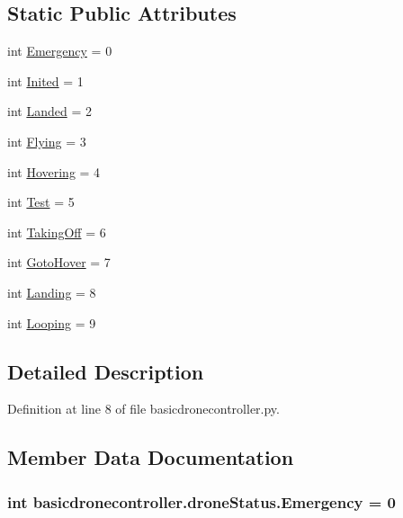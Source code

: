 \subsection*{Static Public Attributes}
\begin{DoxyCompactItemize}
\item 
int \hyperlink{classbasicdronecontroller_1_1droneStatus_aac1e2fb427e0e18858ce2066819ad0b2}{Emergency} = 0
\item 
int \hyperlink{classbasicdronecontroller_1_1droneStatus_a863d58782e3420a6d75708af2918cd62}{Inited} = 1
\item 
int \hyperlink{classbasicdronecontroller_1_1droneStatus_a000dd254bab4b0e9b269b3890e3332c3}{Landed} = 2
\item 
int \hyperlink{classbasicdronecontroller_1_1droneStatus_a5d0bf13223a3b7a124ffaffbdb3dc64b}{Flying} = 3
\item 
int \hyperlink{classbasicdronecontroller_1_1droneStatus_ae3e6d81aa58b0c268e4084606686317d}{Hovering} = 4
\item 
int \hyperlink{classbasicdronecontroller_1_1droneStatus_a9d9bfd54b7f837f4855e4cacb9cfb089}{Test} = 5
\item 
int \hyperlink{classbasicdronecontroller_1_1droneStatus_a922dc19950f805d567027f609b880e29}{Taking\-Off} = 6
\item 
int \hyperlink{classbasicdronecontroller_1_1droneStatus_a9ad6b5e9db4ee151a3547a9e89c5289e}{Goto\-Hover} = 7
\item 
int \hyperlink{classbasicdronecontroller_1_1droneStatus_a81c1b21b3a885042dc0eabf2dfb8366e}{Landing} = 8
\item 
int \hyperlink{classbasicdronecontroller_1_1droneStatus_a17f3b8ae27dc6906ca523270a2247975}{Looping} = 9
\end{DoxyCompactItemize}


\subsection{Detailed Description}


Definition at line 8 of file basicdronecontroller.\-py.



\subsection{Member Data Documentation}
\hypertarget{classbasicdronecontroller_1_1droneStatus_aac1e2fb427e0e18858ce2066819ad0b2}{
\subsubsection[{Emergency}]{\setlength{\rightskip}{0pt plus 5cm}int basicdronecontroller.\-drone\-Status.\-Emergency = 0\hspace{0.3cm}{\ttfamily [static]}}}\label{classbasicdronecontroller_1_1droneStatus_aac1e2fb427e0e18858ce2066819ad0b2}


